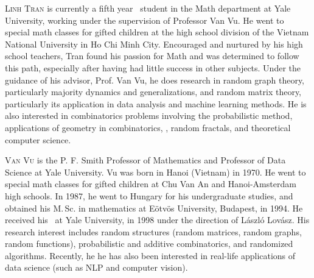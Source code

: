 \documentclass{toc}
\begin{document}
%
%
%
%
%
%
%
%
%
%
%
%
%
%
%
%
%
%
%
\begin{tocaboutauthors}
\begin{tocabout}[tran]  %
\textsc{Linh Tran}
is currently a fifth year \phd\ student in the Math department
at Yale University, working under the supervision of Professor Van Vu.
He went to special math classes for gifted children at the high school
division of the Vietnam National University in Ho Chi Minh City.
Encouraged and nurtured by his high school teachers, Tran found his 
passion for Math and was determined to follow this path,
especially after having had little success in other subjects.  
Under the guidance of his advisor, Prof. Van
Vu, he does research in random graph theory, particularly majority dynamics
and generalizations, and random matrix theory, particularly its application
in data analysis and machine learning methods. He is also interested in
combinatorics problems involving the probabilistic method, applications of
geometry in combinatorics, \eg, random fractals, and theoretical computer
science.
\end{tocabout}
\begin{tocabout}[vu]
\textsc{Van Vu} is the P. F. Smith Professor of Mathematics and Professor of 
Data Science at Yale University. Vu was born in Hanoi (Vietnam) in 1970.
He went to special math classes for gifted children at Chu Van An and 
Hanoi-Amsterdam high schools.
In 1987, he went to Hungary for his undergraduate studies, and obtained his
M.\,Sc. in mathematics at %
Eötvös University, Budapest, in 1994.
He received his \phd\ at Yale University, in 1998 under the direction
of László Lovász. 
His research interest includes random structures (random matrices,
random graphs, random functions), probabilistic and additive combinatorics,
and randomized algorithms.
Recently, he %
he has also been  %
interested in real-life applications of data science
(such as NLP and computer vision). 
\end{tocabout}
\end{tocaboutauthors}
			
\end{document}
